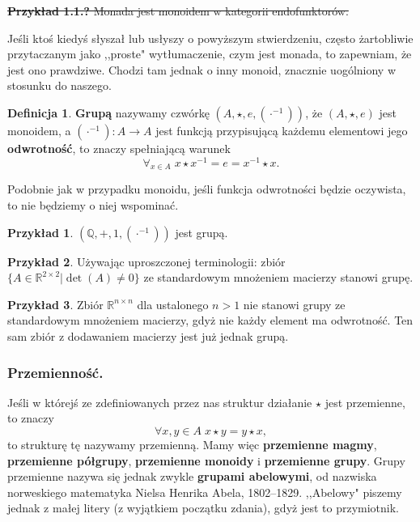 \documentclass{article}
\theoremstyle{definition}
\newtheorem{definition}{Definicja}[section]
\newtheorem{example}{Przykład}[section]
\begin{document}
\noindent\sout{
	\textbf{Przykład 1.1.?} Monada jest monoidem w kategorii endofunktorów.
}

Jeśli ktoś kiedyś słyszał lub usłyszy o powyższym stwierdzeniu, często żartobliwie przytaczanym jako ,,proste" wytłumaczenie, czym jest monada, to zapewniam, że jest ono prawdziwe. Chodzi tam jednak o inny monoid, znacznie uogólniony w stosunku do naszego.

\begin{definition}
    \textbf{Grupą} nazywamy czwórkę $(A, \star, e, (\cdot^{-1}))$, że $(A, \star, e)$ jest monoidem, a $(\cdot^{-1}): A \to A$ jest funkcją przypisującą każdemu elementowi jego \textbf{odwrotność}, to znaczy spełniającą warunek
	\begin{equation*}
		\forall_{x \in A}\; {x\star x^{-1} = e = x^{-1} \star x}.
	\end{equation*}
\end{definition}
Podobnie jak w przypadku monoidu,
	jeśli funkcja odwrotności będzie oczywista,
	to nie będziemy o niej wspominać.

\begin{example}
	$(\mathbb{Q}, +, 1, (\cdot^{-1}))$ jest grupą.
\end{example}

\begin{example}
	Używając uproszczonej terminologii: zbiór $\{A \in \mathbb{R}^{2 \times 2} | \det(A) \neq 0 \}$
		ze standardowym mnożeniem macierzy stanowi grupę.
\end{example}

\begin{example}
	Zbiór $\mathbb{R}^{n \times n}$ dla ustalonego $n > 1$ nie stanowi grupy
		ze standardowym mnożeniem macierzy,
		gdyż nie każdy element ma odwrotność.
	Ten sam zbiór z dodawaniem macierzy jest już jednak grupą.
\end{example}

\subsubsection{Przemienność.}
Jeśli w którejś ze zdefiniowanych przez nas struktur działanie $\star$ jest przemienne, to znaczy
\begin{equation}
	\forall{x,y \in A}\; x \star y = y \star x,
\end{equation}
to strukturę tę nazywamy przemienną.
Mamy więc \textbf{przemienne magmy}, \textbf{przemienne półgrupy}, \textbf{przemienne monoidy} i \textbf{przemienne grupy}.
Grupy przemienne nazywa się jednak zwykle \textbf{grupami abelowymi},
od nazwiska norweskiego matematyka Nielsa Henrika Abela, 1802--1829.
,,Abelowy" piszemy jednak z małej litery (z wyjątkiem początku zdania), gdyż jest to przymiotnik.
\end{document}
